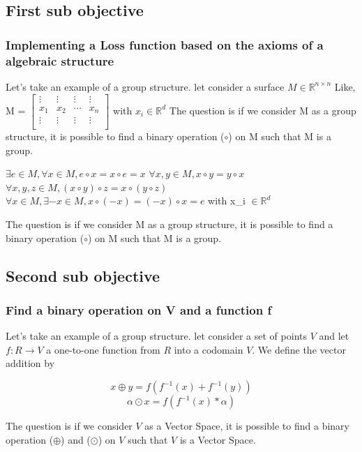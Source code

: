 \documentclass{beamer}
\begin{document}
    \subsection{First sub objective} 
    \begin{frame}
        \frametitle{Implementing a Loss function based on the axioms of a
        algebraic structure}
        Let's take an example of a group structure.
        let consider a surface $M \in \mathbb{R}^{n \times n}$
        Like, 
        M = 
        $
        \begin{bmatrix}
            \vdots & \vdots & \vdots &\vdots \\
            x_{1} & x_{2} & \cdots & x_{n} \\
            \vdots & \vdots & \vdots &\vdots \\
        \end{bmatrix}
        $
        with $ x_{i} \in \mathbb{R}^{d}$
        The question is if we consider M as a group structure, it is possible to find a binary operation ($\circ$) on M such that M is a group.
        \begin{enumerate}
            $\exists e \in M, \forall x \in M, e \circ x = x \circ e = x$
            $\forall x,y \in M, x \circ y = y \circ x$
            $\forall x,y,z \in M, (x \circ y) \circ z = x \circ (y \circ z)$
            $\forall x \in M, \exists -x \in M, x \circ (-x) = (-x) \circ x=e$
        with x_{i} $\in \mathbb{R}^{d}$
        \end{enumerate}
        The question is if we consider M as a group structure, it is possible to find a binary operation ($\circ$) on M such that M is a group.
        
    \end{frame}
    \subsection{Second sub objective}
    \begin{frame}

        \frametitle{Find a binary operation on V and a function f }



        Let's take an example of a group structure.
        let consider a set of points  $ V $ and let  $ f: R \rightarrow V $ a one-to-one
        function from $R$ into a codomain $V$. We define the vector addition by

        $$ x \oplus y = f(f^{-1}(x) + f^{-1}(y)) $$
        $$ \alpha \odot x = f(f^{-1}(x) * \alpha) $$


        The question is if we consider $V$ as a Vector Space, it is possible to find a binary operation ($\oplus$) and ($\odot$) on $V$ such that $V$ is a Vector Space.
        
    \end{frame}
\end{document}
